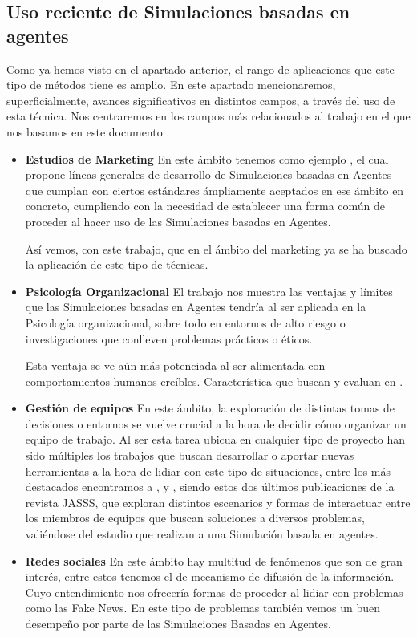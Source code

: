 \subsection{Uso reciente de Simulaciones basadas en agentes}

Como ya hemos visto en el apartado anterior, el rango de aplicaciones que este tipo de métodos tiene es amplio. En este apartado mencionaremos, superficialmente, avances significativos en distintos campos, a través del uso de esta técnica. Nos centraremos en los campos más relacionados al trabajo en el que nos basamos en este documento \cite{park2023generative}.

\begin{itemize}
	\item \textbf{Estudios  de Marketing} En este ámbito tenemos como ejemplo \cite{rand2011agent}, el cual propone líneas generales de desarrollo de Simulaciones basadas en Agentes que cumplan con ciertos estándares ámpliamente aceptados en ese ámbito en concreto, cumpliendo con la necesidad de establecer una forma común de proceder al hacer uso de las Simulaciones basadas en Agentes.

Así vemos, con este trabajo, que en el ámbito del marketing ya se ha buscado la aplicación de este tipo de técnicas.
	\item \textbf{Psicología Organizacional} El trabajo \cite{hughes2012agent} nos muestra las ventajas y límites que las Simulaciones basadas en Agentes tendría al ser aplicada en la Psicología organizacional, sobre todo en entornos de alto riesgo o investigaciones que conlleven problemas prácticos o éticos.

Esta ventaja se ve aún más potenciada al ser alimentada con comportamientos humanos creíbles. Característica que buscan y evaluan en \cite{park2023generative}.
	\item \textbf{Gestión de equipos} En este ámbito, la exploración de distintas tomas de decisiones o entornos se vuelve crucial a la hora de decidir cómo organizar un equipo de trabajo. Al ser esta tarea ubicua en cualquier tipo de proyecto han sido múltiples los trabajos que buscan desarrollar o aportar nuevas herramientas a la hora de lidiar con este tipo de situaciones, entre los más destacados encontramos a \cite{crowder2012development}, \cite{boroomand2021hard} y \cite{boroomand2023superiority}, siendo estos dos últimos publicaciones de la revista JASSS, que exploran distintos escenarios y formas de interactuar entre los miembros de equipos que buscan soluciones a diversos problemas, valiéndose del estudio que realizan a una Simulación basada en agentes.
	\item \textbf{Redes sociales} En este ámbito hay multitud de fenómenos que son de gran interés, entre estos tenemos el de mecanismo de difusión de la información. Cuyo entendimiento nos ofrecería formas de proceder al lidiar con problemas como las Fake News. En este tipo de problemas también vemos un buen desempeño por parte de las Simulaciones Basadas en Agentes.


\end{itemize}
